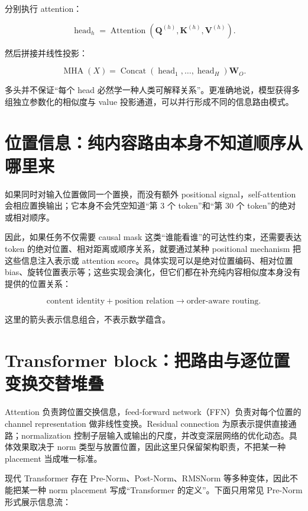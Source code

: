 \documentclass[profile=standard,twoside=false]{ipara-handbook}
\begin{document}
分别执行 attention：

$$
\operatorname{head}_h
=\operatorname{Attention}
\left(
\boldsymbol{Q}^{(h)},
\boldsymbol{K}^{(h)},
\boldsymbol{V}^{(h)}
\right).
$$

然后拼接并线性投影：

$$
\operatorname{MHA}(X)
=\operatorname{Concat}(\operatorname{head}_1,\ldots,\operatorname{head}_H)\boldsymbol{W}_O.
$$

多头并不保证“每个 head 必然学一种人类可解释关系”。更准确地说，模型获得多组独立参数化的相似度与 value 投影通道，可以并行形成不同的信息路由模式。

\section{位置信息：纯内容路由本身不知道顺序从哪里来}

如果同时对输入位置做同一个置换，而没有额外 positional signal，self-attention 会相应置换输出；它本身不会凭空知道“第 3 个 token”和“第 30 个 token”的绝对或相对顺序。

因此，如果任务不仅需要 causal mask 这类“谁能看谁”的可达性约束，还需要表达 token 的绝对位置、相对距离或顺序关系，就要通过某种 positional mechanism 把这些信息注入表示或 attention score。具体实现可以是绝对位置编码、相对位置 bias、旋转位置表示等；这些实现会演化，但它们都在补充纯内容相似度本身没有提供的位置关系：

$$
\boxed{
\text{content identity}
+\text{position relation}
\longrightarrow
\text{order-aware routing}
}.
$$

这里的箭头表示信息组合，不表示数学蕴含。

\section{Transformer block：把路由与逐位置变换交替堆叠}

Attention 负责跨位置交换信息，feed-forward network（FFN）负责对每个位置的 channel representation 做非线性变换。Residual connection 为原表示提供直接通路；normalization 控制子层输入或输出的尺度，并改变深层网络的优化动态。具体效果取决于 norm 类型与放置位置，因此这里只保留架构职责，不把某一种 placement 当成唯一标准。

现代 Transformer 存在 Pre-Norm、Post-Norm、RMSNorm 等多种变体，因此不能把某一种 norm placement 写成“Transformer 的定义”。下面只用常见 Pre-Norm 形式展示信息流：

\begin{handbookdiagram}
\centering

\end{handbookdiagram}
\end{document}
